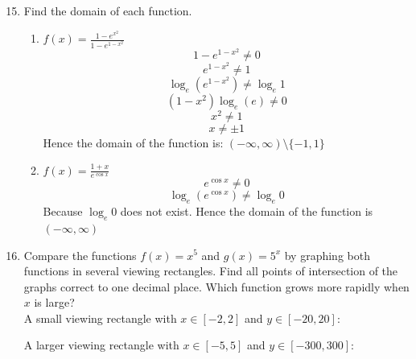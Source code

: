\documentclass[12pt]{article}
\begin{document}
\begin{enumerate}
\setcounter{enumi}{14}
        \item Find the domain of each function.
        \begin{enumerate}
            \item \(f(x) = \frac{1-e^{x^2}}{1-e^{1-x^2}}\)
            \[1-e^{1-x^2} \neq 0\]
            \[e^{1-x^2} \neq 1\]
            \[\log_e (e^{1-x^2}) \neq \log_e 1\]
            \[(1-x^2)\log_e(e) \neq 0\]
            \[x^2 \neq 1\]
            \[x \neq \pm 1\]
            Hence the domain of the function is: $(-\infty, \infty) \setminus \{-1,1\}$
            \item \(f(x) = \frac{1+x}{e^{\cos x}}\)
            \[e^{\cos x} \neq 0\]
            \[\log_e (e^{\cos x}) \neq \log_e 0\]
            Because $\log_e 0$ does not exist. Hence the domain of the function is $(-\infty,\infty)$
        \end{enumerate}
\setcounter{enumi}{19}
        \item Compare the functions $f(x) = x^5$ and $g(x) = 5^x$ by graphing both functions in several viewing rectangles. Find all points of intersection of the graphs correct to one decimal place. Which function grows more rapidly when $x$ is large?\\
        A small viewing rectangle with $x \in [-2,2]$ and $y \in [-20,20]$:
        \begin{center}
        \end{center}
        A larger viewing rectangle with $x \in [-5,5]$ and $y \in [-300,300]$:
        \begin{center}
\end{center}
\end{enumerate}
\end{document}
